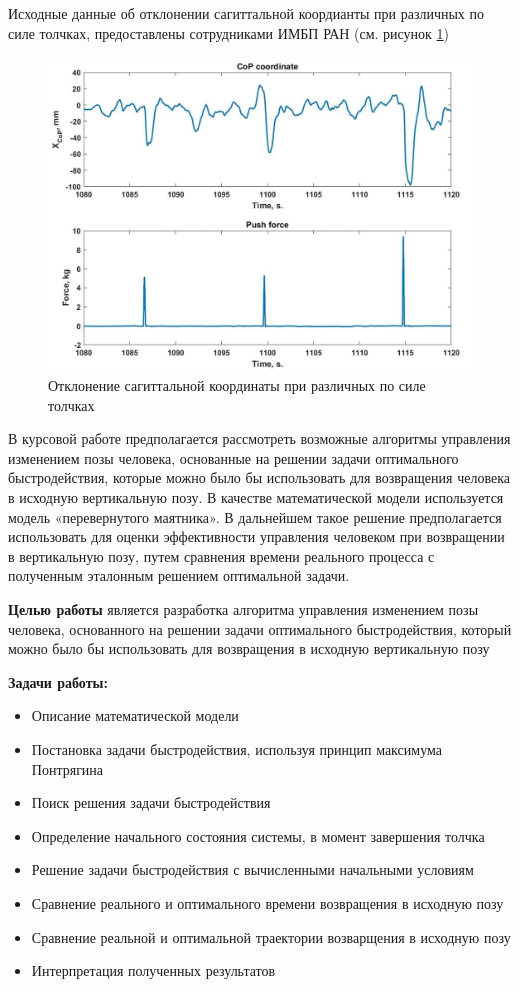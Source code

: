 \documentclass[a4paper,12pt, openany]{book}
\theoremstyle{plain} %
\theoremstyle{definition} %
\theoremstyle{remark} %
\numberwithin{equation}{chapter}
\begin{document}
{Исходные данные об отклонении сагиттальной коордианты при различных по силе толчках, предоставлены сотрудниками ИМБП РАН (см. рисунок \ref{fig:pushes})
\begin{figure}[h!]
    \centering
    \includegraphics[width=0.9\linewidth]{Pushes.png}
    \caption{Отклонение сагиттальной координаты при различных по силе толчках}
    \label{fig:pushes}
\end{figure}

В курсовой работе предполагается рассмотреть возможные
алгоритмы управления изменением позы человека, основанные на решении задачи
оптимального быстродействия, которые можно было бы использовать для
возвращения человека в исходную вертикальную позу. В качестве математической модели
используется модель «перевернутого маятника»\cite{PAKrychinin,kasatkin,gurfincel}. В дальнейшем
такое решение предполагается использовать для оценки эффективности управления человеком
при возвращении в вертикальную позу, путем сравнения
времени реального процесса с полученным эталонным решением оптимальной задачи.


\textbf{Целью работы} является разработка алгоритма управления изменением позы человека, основанного на решении задачи оптимального быстродействия,
который можно было бы использовать для возвращения в исходную вертикальную позу

\textbf{Задачи работы: }
\begin{itemize} 
    \item Описание математической модели
    \item Постановка задачи быстродействия, используя принцип максимума Понтрягина
    \item Поиск решения задачи быстродействия
    \item Определение начального состояния системы, в момент завершения толчка
    \item Решение задачи быстродействия с вычисленными начальными условиям
    \item Сравнение реального и оптимального времени возвращения в исходную позу
    \item Сравнение реальной и оптимальной траектории возварщения в исходную позу
    \item Интерпретация полученных результатов
\end{itemize} 

}
\end{document}
